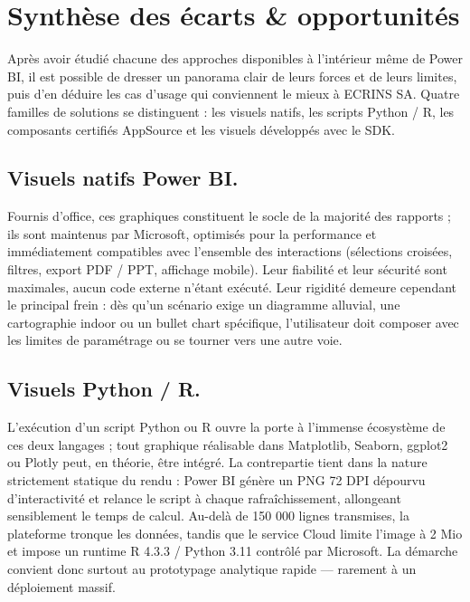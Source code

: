 \section{Synthèse des écarts \& opportunités}
\label{sec:synthese}

Après avoir étudié chacune des approches disponibles à l’intérieur même de Power BI, il est possible de dresser un panorama clair de leurs forces et de leurs limites, puis d’en déduire les cas d’usage qui conviennent le mieux à ECRINS SA. Quatre familles de solutions se distinguent : les visuels natifs, les scripts Python / R, les composants certifiés AppSource et les visuels développés avec le SDK.


\subsection{Visuels natifs Power BI.}  
Fournis d’office, ces graphiques constituent le socle de la majorité des rapports ; ils sont maintenus par Microsoft, optimisés pour la performance et immédiatement compatibles avec l’ensemble des interactions (sélections croisées, filtres, export PDF / PPT, affichage mobile). Leur fiabilité et leur sécurité sont maximales, aucun code externe n’étant exécuté. Leur rigidité demeure cependant le principal frein : dès qu’un scénario exige un diagramme alluvial, une cartographie indoor ou un bullet chart spécifique, l’utilisateur doit composer avec les limites de paramétrage ou se tourner vers une autre voie.


\subsection{Visuels Python / R.}  
L’exécution d’un script Python ou R ouvre la porte à l’immense écosystème de ces deux langages ; tout graphique réalisable dans Matplotlib, Seaborn, ggplot2 ou Plotly peut, en théorie, être intégré. La contrepartie tient dans la nature strictement statique du rendu : Power BI génère un PNG 72 DPI dépourvu d’interactivité et relance le script à chaque rafraîchissement, allongeant sensiblement le temps de calcul. Au-delà de 150 000 lignes transmises, la plateforme tronque les données, tandis que le service Cloud limite l’image à 2 Mio et impose un runtime R 4.3.3 / Python 3.11 contrôlé par Microsoft. La démarche convient donc surtout au prototypage analytique rapide — rarement à un déploiement massif.


